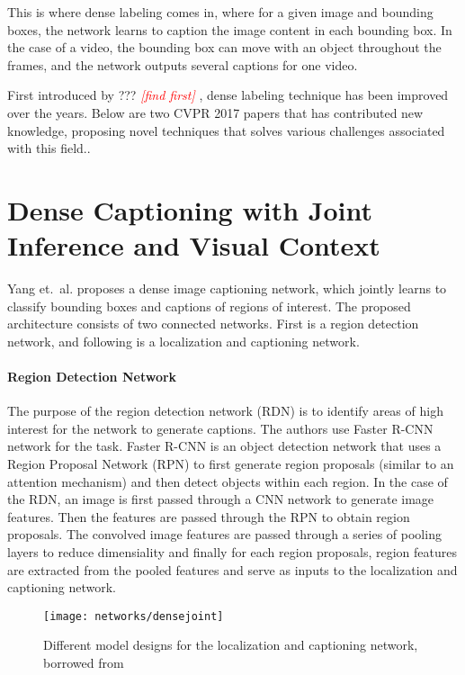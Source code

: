 \documentclass[12pt,onecolumn,letterpaper,draftclsnofoot]{article}
\newcommand{\todo}[1]{\textcolor{red}{{\em [#1]}} }
\begin{document}
This is where dense labeling comes in, where for a given image and bounding
boxes, the network learns to caption the image content in each bounding box.
In the case of a video, the bounding box can move with an object throughout
the frames, and the network outputs several captions for one video.

First introduced by ??? \todo{find first}, dense labeling technique has been
improved over the years. Below are two CVPR 2017 papers that has contributed
new knowledge, proposing novel techniques that solves various challenges
associated with this field..

\section{Dense Captioning with Joint Inference and Visual Context}
Yang et.\ al.\cite{denseyang} proposes a dense image captioning network, which
jointly learns to classify bounding boxes and captions of regions of interest.
The proposed architecture consists of two connected networks. First is a
region detection network, and following is a localization and captioning
network.

\paragraph{Region Detection Network}
The purpose of the region detection network (RDN) is to identify areas of high
interest for the network to generate captions. The authors use Faster R-CNN
network \cite{renNIPS15fasterrcnn} for the task. Faster R-CNN is an object
detection network that uses a Region Proposal Network (RPN) to first generate
region proposals (similar to an attention mechanism) and then detect objects
within each region. In the case of the RDN, an image is first passed through a
CNN network to generate image features. Then the features are passed through
the RPN to obtain region proposals. The convolved image features are passed
through a series of pooling layers to reduce dimensiality and finally for each
region proposals, region features are extracted from the pooled features and
serve as inputs to the localization and captioning network.

\begin{figure}
  \centering
  \texttt{[image: networks/densejoint]}
  \caption{Different model designs for the localization and captioning
  network, borrowed from \cite{renNIPS15fasterrcnn}}
  \label{fig:densejoint}
\end{figure}
\end{document}
